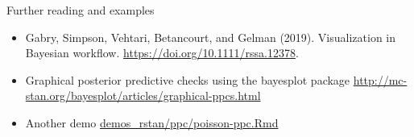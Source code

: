 \documentclass[t]{beamer}
\begin{document}
\begin{frame}{Further reading and examples}

  \begin{itemize}
  \item Gabry, Simpson, Vehtari, Betancourt, and Gelman
    (2019). Visualization in Bayesian
    workflow. \url{https://doi.org/10.1111/rssa.12378}.
  \item Graphical posterior predictive checks using the bayesplot package
    \url{http://mc-stan.org/bayesplot/articles/graphical-ppcs.html}
  \item Another demo \href{http://avehtari.github.io/BDA_R_demos/demos_rstan/ppc/poisson-ppc.html}{demos\_rstan/ppc/poisson-ppc.Rmd}
  \end{itemize}
  
\end{frame}
\end{document}
